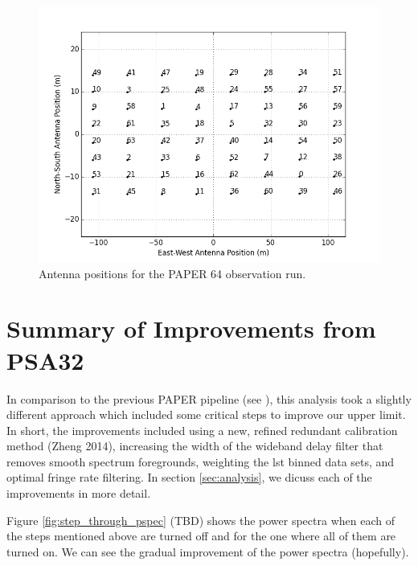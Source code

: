 \documentclass[twocolumn,numberedappendix]{emulateapj}
\begin{document}
\begin{figure}[!t]\centering
\includegraphics[width=1.85\columnwidth,height=\columnwidth]{plots/antenna_positions.png}
\caption{Antenna positions for the PAPER 64 observation run.}
\label{fig:antenna_positions}
\end{figure}

\section{Summary of Improvements from PSA32}
In comparison to the previous PAPER pipeline (see \cite{parsons_et_al2014}),
this analysis took a slightly different approach which included some critical
steps to improve our upper limit. In short, the improvements included using a
new, refined redundant calibration method (Zheng 2014), increasing the width of
the wideband delay filter that removes smooth spectrum foregrounds, weighting
the lst binned data sets, and optimal fringe rate filtering. In section
\ref{sec:analysis}, we dicuss each of the improvements in more detail.

Figure \ref{fig:step_through_pspec} (TBD) shows the power spectra when each of
the steps mentioned above are turned off and for the one where all of them are
turned on. We can see the gradual improvement of the power spectra (hopefully).
\end{document}
